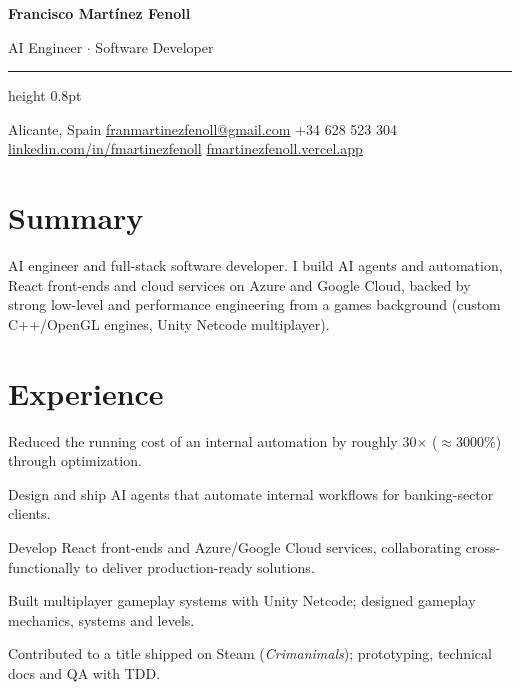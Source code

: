 \documentclass[10pt,a4paper]{article}
\begin{document}
{\centering \Huge\bfseries Francisco Mart\'inez Fenoll \par}
\vspace{2pt}
{\centering \large AI Engineer $\cdot$ Software Developer \par}
\vspace{3pt}
\hrule height 0.8pt
\vspace{4pt}
{\centering \small
Alicante, Spain \textbullet{}
\href{mailto:franmartinezfenoll@gmail.com}{franmartinezfenoll@gmail.com} \textbullet{}
+34 628 523 304 \textbullet{}
\href{https://www.linkedin.com/in/fmartinezfenoll}{linkedin.com/in/fmartinezfenoll} \textbullet{}
\href{https://fmartinezfenoll.vercel.app}{fmartinezfenoll.vercel.app}
\par}

\section{Summary}
AI engineer and full-stack software developer. I build AI agents and automation, React front-ends and cloud services on Azure and Google Cloud, backed by strong low-level and performance engineering from a games background (custom C++/OpenGL engines, Unity Netcode multiplayer).

\section{Experience}

\begin{cvitems}
  \item Reduced the running cost of an internal automation by roughly 30$\times$ ($\approx$3000\%) through optimization.
  \item Design and ship AI agents that automate internal workflows for banking-sector clients.
  \item Develop React front-ends and Azure/Google Cloud services, collaborating cross-functionally to deliver production-ready solutions.
\end{cvitems}
\entrygap

\begin{cvitems}
  \item Built multiplayer gameplay systems with Unity Netcode; designed gameplay mechanics, systems and levels.
  \item Contributed to a title shipped on Steam (\textit{Crimanimals}); prototyping, technical docs and QA with TDD.
\end{cvitems}
\entrygap
\end{document}
